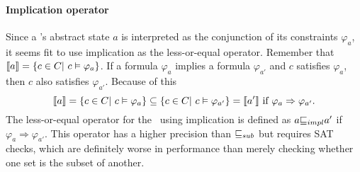 \paragraph*{Implication operator}
Since a \constraintsCPA 's abstract state $a$ is interpreted as the conjunction of its constraints $\varphi_a$, it seems fit to use implication as the less-or-equal operator.
Remember that $\llbracket a \rrbracket = \{ c \in C |\ c \satisfies \varphi_a \}$.
If a formula $\varphi_a$ implies a formula $\varphi_{a'}$ and $c$ satisfies $\varphi_a$, then $c$ also satisfies $\varphi_{a'}$.
Because of this 
\[\llbracket a \rrbracket = \{ c \in C |\ c \vDash \varphi_a \} \subseteq \{ c \in C |\ c \vDash \varphi_{a'} \} = \llbracket a' \rrbracket \text{ if } \varphi_a \Rightarrow \varphi_{a'}.\]
The less-or-equal operator for the \constraintsCPA\ using implication is defined as $a {\sqsubseteq_{impl}} a'$ if $\varphi_a \Rightarrow \varphi_{a'}$.
This operator has a higher precision than ${\sqsubseteq_{sub}}$ but requires SAT checks, which are definitely worse in performance than merely checking whether one set is the subset of another.

